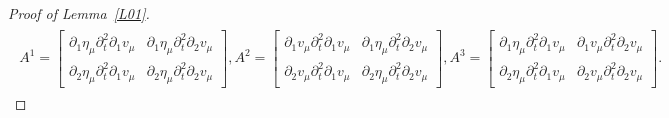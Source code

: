 \documentclass[10pt,reqno]{amsart}
\theoremstyle{plain}
\theoremstyle{definition}
\numberwithin{equation}{section}
\newcommand{\al}{\alpha}
\newcommand{\la}{\lambda}
\def\referee#1{{\color{green}\hbox{\bf ~#1~}}} %
\begin{document}
\begin{proof}[Proof of Lemma~\ref{L01}]
\begin{align}
\begin{split}
A^1 = 
\begin{bmatrix}
\partial_1 \eta_\mu \partial^2_t \partial_1 v_\mu
&
\partial_1 \eta_\mu \partial^2_t \partial_2 v_\mu
\\
\partial_2 \eta_\mu \partial^2_t \partial_1 v_\mu
&
\partial_2 \eta_\mu \partial^2_t \partial_2 v_\mu
\end{bmatrix},
A^2 = 
\begin{bmatrix}
\partial_1 v_\mu \partial^2_t \partial_1 v_\mu
&
\partial_1 \eta_\mu \partial^2_t \partial_2 v_\mu
\\
\partial_2 v_\mu \partial^2_t \partial_1 v_\mu
&
\partial_2 \eta_\mu \partial^2_t \partial_2 v_\mu
\end{bmatrix},
A^3 = 
\begin{bmatrix}
\partial_1 \eta_\mu \partial^2_t \partial_1 v_\mu
&
\partial_1 v_\mu \partial^2_t \partial_2 v_\mu
\\
\partial_2 \eta_\mu \partial^2_t \partial_1 v_\mu
&
\partial_2 v_\mu \partial^2_t \partial_2 v_\mu
\end{bmatrix}.
\end{split}
\nonumber
\end{align}
%

\end{proof}
\end{document}

